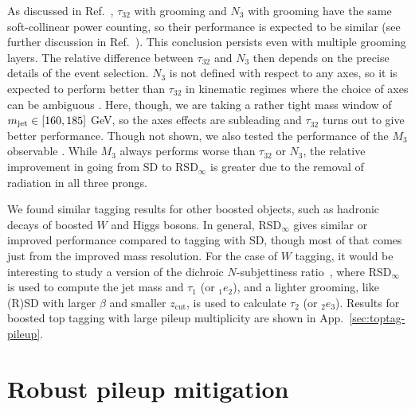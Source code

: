 \documentclass[11pt,a4paper]{article}
\newcommand{\zcut}{z_\text{cut}}
\DeclareRobustCommand{\App}[1]{App.~\ref{#1}}
\DeclareRobustCommand{\Ref}[1]{Ref.~\cite{#1}}
\begin{document}
As discussed in \Ref{Moult:2016cvt}, $\tau_{32}$ with grooming and $N_3$ with grooming have the same soft-collinear power counting, so their performance is expected to be similar (see further discussion in \Ref{Larkoski:2014gra}).
%
This conclusion persists even with multiple grooming layers.
%
The relative difference between $\tau_{32}$ and $N_3$ then depends on the precise details of the event selection.
%
$N_3$ is not defined with respect to any axes, so it is expected to perform better than $\tau_{32}$ in kinematic regimes where the choice of axes can be ambiguous \cite{Moult:2016cvt}.
%
Here, though, we are taking a rather tight mass window of $m_{\rm jet}
\in [160,185]$ GeV, so the axes effects are subleading and $\tau_{32}$
turns out to give better performance.
%
Though not shown, we also tested the performance of the $M_3$ observable \cite{Moult:2016cvt}.
%
While $M_3$ always performs worse than $\tau_{32}$ or $N_3$, the relative improvement in going from SD to RSD$_\infty$ is greater due to
the removal of radiation in all three prongs.

We found similar tagging results for other boosted objects, such as hadronic decays of boosted $W$ and Higgs bosons.
%
In general, RSD$_\infty$ gives similar or improved performance compared to tagging with SD, though most of that comes just from the improved mass resolution.
%
For the case of $W$ tagging,
  it would be interesting to study a version of the dichroic
  $N$-subjettiness ratio~\cite{Salam:2016yht}, where RSD$_\infty$ is
  used to compute the jet mass and $\tau_1$ (or ${}_1e_2$), and a lighter
  grooming, like (R)SD with larger $\beta$ and smaller $\zcut$,
  is used to calculate $\tau_2$ (or ${}_2e_3$).
%
Results for boosted top tagging with large pileup multiplicity are shown in \App{sec:toptag-pileup}.



\section{Robust pileup mitigation}
\label{sec:pileup-mitigation}
\end{document}
